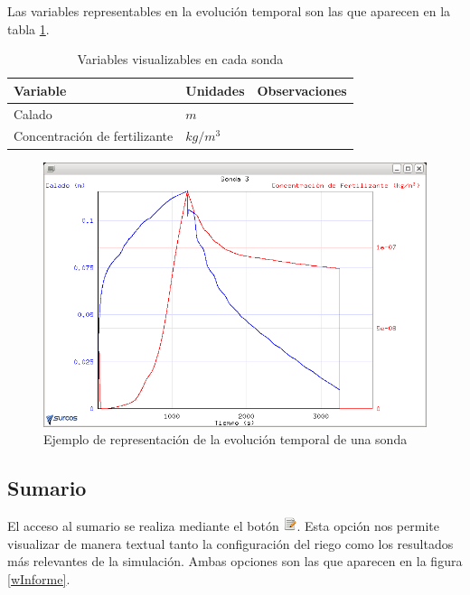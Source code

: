 Las variables representables en la evolución temporal son las que aparecen en la tabla \ref{tableVariables3}.

\begin{table}[h]\footnotesize
\begin{center}
\begin{tabular}{llr}
\hline
Variable & Unidades & Observaciones \\
\hline
Calado & $m$ \\
Concentración de fertilizante & $ kg/m^3 $\\
\hline
\end{tabular}
\end{center}
  \caption{Variables visualizables en cada sonda}\label{tableVariables3}
\end{table}

\begin{figure}[!h]
\begin{center}
\includegraphics*[width=\textwidth]{images/evoSonda.png}
\qquad
\caption{Ejemplo de representación de la evolución temporal de una sonda}\label{evo3}
\end{center}
\end{figure}

\subsection{Sumario}

El acceso al sumario se realiza mediante el botón \includegraphics[height=0.4cm]{images/gtk-edit.png}. Esta opción nos permite visualizar de manera textual tanto la configuración del riego como los resultados más relevantes de la simulación. Ambas opciones son las que aparecen en la figura \ref{wInforme}.

